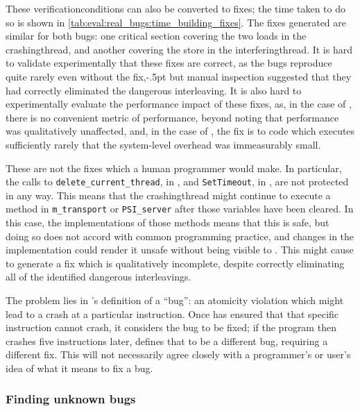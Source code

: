 \noindent
These \glspl{verificationcondition} can also be converted to fixes;
the time taken to do so is shown in
\autoref{tab:eval:real_bugs:time_building_fixes}.  The fixes generated
are similar for both bugs: one critical section covering the two loads
in the \gls{crashingthread}, and another covering the store in the
\gls{interferingthread}.  It is hard to validate experimentally that
these fixes are correct, as the bugs reproduce quite rarely even
without the fix,\kern-.5pt but
manual inspection suggested that they had correctly eliminated the
dangerous interleaving.  It is also hard to experimentally evaluate
the performance impact of these fixes, as, in the case of
, there is no convenient metric of performance,
beyond noting that performance was qualitatively unaffected, and, in
the case of , the fix is to code which executes
sufficiently rarely that the system-level overhead was immeasurably
small.

These are not the fixes which a human programmer would make.  In
particular, the calls to \texttt{delete\_current\_thread}, in
, and \texttt{SetTimeout}, in ,
are not protected in any way.  This means that the
\gls{crashingthread} might continue to execute a method in
\texttt{m\_transport} or \texttt{PSI\_server} after those variables
have been cleared.  In this case, the implementations of those methods
means that this is safe, but doing so does not accord with common
programming practice, and changes in the implementation could render
it unsafe without being visible to {\technique}.  This might cause
{\technique} to generate a fix which is qualitatively incomplete,
despite correctly eliminating all of the identified dangerous
interleavings.

The problem lies in {\technique}'s definition of a ``bug'': an
atomicity violation which might lead to a crash at a particular
instruction.  Once {\technique} has ensured that that specific
instruction cannot crash, it considers the bug to be fixed; if the
program then crashes five instructions later, {\technique} defines
that to be a different bug, requiring a different fix.  This will not
necessarily agree closely with a programmer's or user's idea of what
it means to fix a bug.

\subsubsection{Finding unknown bugs}
\label{sect:how:finding_unknown}

